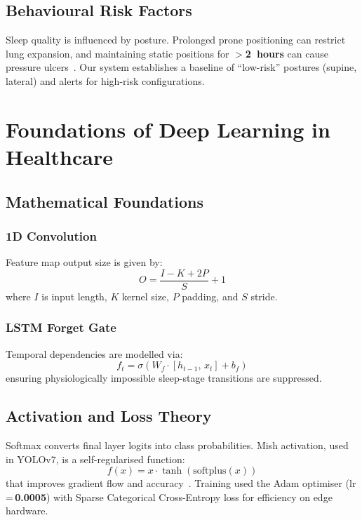 \documentclass[10pt, a4paper, twocolumn]{article}
\begin{document}
\subsection{Behavioural Risk Factors}

Sleep quality is influenced by posture. Prolonged prone positioning can restrict lung
expansion, and maintaining static positions for \textbf{$>$2~hours} can cause
pressure ulcers~\cite{ref3}. Our system establishes a baseline of ``low-risk''
postures (supine, lateral) and alerts for high-risk configurations.

\section{Foundations of Deep Learning in Healthcare}

\subsection{Mathematical Foundations}

\subsubsection{1D Convolution}
Feature map output size is given by:
\begin{equation}
  O = \frac{I - K + 2P}{S} + 1
\end{equation}
where $I$ is input length, $K$ kernel size, $P$ padding, and $S$ stride.

\subsubsection{LSTM Forget Gate}
Temporal dependencies are modelled via:
\begin{equation}
  f_t = \sigma\!\left(W_f \cdot [h_{t-1},\, x_t] + b_f\right)
\end{equation}
ensuring physiologically impossible sleep-stage transitions are suppressed.

\subsection{Activation and Loss Theory}

Softmax converts final layer logits into class probabilities. Mish activation, used
in YOLOv7, is a self-regularised function:
\begin{equation}
  f(x) = x \cdot \tanh\!\left(\mathrm{softplus}(x)\right)
\end{equation}
that improves gradient flow and accuracy~\cite{ref9}. Training used the Adam
optimiser (lr\,=\,\textbf{0.0005}) with Sparse Categorical Cross-Entropy loss for
efficiency on edge hardware.
\end{document}
